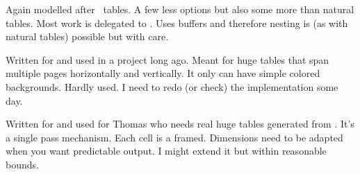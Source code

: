 \stopchapter

\startchapter[title=Extreme tables]

\startitemize
    \startitem
        Again modelled after \HTML\ tables.
    \stopitem
    \startitem
        A few less options but also some more than natural tables.
    \stopitem
    \startitem
        Most work is delegated to \LUA.
    \stopitem
    \startitem
        Uses buffers and therefore nesting is (as with natural tables)
        possible but with care.
    \stopitem
\stopitemize

\stopchapter

\startchapter[title=Line tables]

\startitemize
    \startitem
        Written for and used in a project long ago.
    \stopitem
    \startitem
        Meant for huge tables that span multiple pages horizontally
        and vertically.
    \stopitem
    \startitem
        It only can have simple colored backgrounds.
    \stopitem
    \startitem
        Hardly used.
    \stopitem
    \startitem
        I need to redo (or check) the implementation some day.
    \stopitem
\stopitemize

\startchapter[title=Frame tables]

\startitemize
    \startitem
        Written for and used for Thomas who needs real huge tables
        generated from \XML.
    \stopitem
    \startitem
        It's a single pass mechanism.
    \stopitem
    \startitem
        Each cell is a framed.
    \stopitem
    \startitem
        Dimensions need to be adapted when you want predictable output.
    \stopitem
    \startitem
        I might extend it but within reasonable bounds.
    \stopitem
\stopitemize

\stopchapter


\stopdocument
